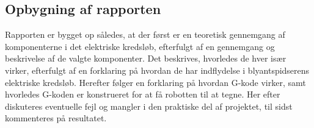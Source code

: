 \subsection{Opbygning af rapporten}
Rapporten er bygget op således, at der først er en teoretisk gennemgang af komponenterne i det elektriske kredsløb, efterfulgt af en gennemgang og beskrivelse af de valgte komponenter. Det beskrives, hvorledes de hver især virker, efterfulgt af en forklaring på hvordan de har indflydelse i blyantspidserens elektriske kredsløb. Herefter følger en forklaring på hvordan G-kode virker, samt hvorledes G-koden er konstrueret for at få robotten til at tegne. Her efter diskuteres eventuelle fejl og mangler i den praktiske del af projektet, til sidst kommenteres på resultatet.\\ 



